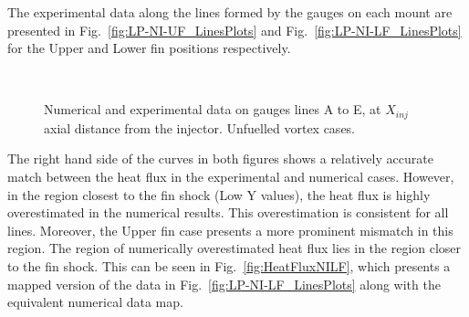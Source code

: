 \documentclass{AIAA}
\begin{document}
The experimental data along the lines formed by the gauges on each mount are presented in Fig.~\ref{fig:LP-NI-UF_LinesPlots} and Fig.~\ref{fig:LP-NI-LF_LinesPlots} for the Upper and Lower fin positions respectively.


\begin{figure}[!h]
\center
%
\\
\caption{Numerical and experimental data on gauges lines A to E, at $X_{inj}$ axial distance from the injector. Unfuelled vortex cases.}
\label{fig:HeatFluxVortex_Lines}
\end{figure} 


The right hand side of the curves in both figures shows a relatively accurate match between the heat flux in the experimental and numerical cases.
However, in the region closest to the fin shock (Low Y values), the heat flux is highly overestimated in the numerical results.
This overestimation is consistent for all lines.
Moreover, the Upper fin case presents a more prominent mismatch in this region.
The region of numerically overestimated heat flux lies in the region closer to the fin shock.
This can be seen in Fig.~\ref{fig:HeatFluxNILF}, which presents a mapped version of the data in Fig.~\ref{fig:LP-NI-LF_LinesPlots} along with the equivalent numerical data map.
\end{document}
